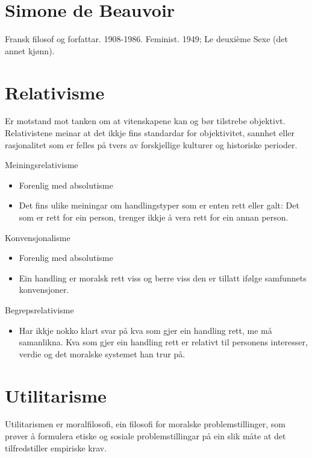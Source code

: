 \documentclass[a4paper]{IEEEtran}
\begin{document}
\section{Simone de Beauvoir}
\label{beauvoir}

Fransk filosof og forfattar. 1908-1986. Feminist. 1949; Le deuxième Sexe (det annet kjønn). 
\clearpage
\section{Relativisme}
\label{relativisme}
Er motstand mot tanken om at vitenskapene kan og bør tilstrebe objektivt. Relativistene meinar at det ikkje fins standardar for objektivitet, sannhet eller rasjonalitet som er felles på tvers av forskjellige kulturer og historiske perioder.
\bigskip

Meiningsrelativisme\bigskip
\begin{itemize}
    \item Forenlig med absolutisme
    \item Det fins ulike meiningar om handlingstyper som er enten rett eller galt: Det som er rett for ein person, trenger ikkje å vera rett for ein annan person.
\end{itemize}\bigskip

Konvensjonalisme\bigskip
\begin{itemize}
    \item Forenlig med absolutisme
    \item Ein handling er moralsk rett viss og berre viss den er tillatt ifølge samfunnets konvensjoner.
\end{itemize}\bigskip

Begrepsrelativisme\bigskip
\begin{itemize}
    \item Har ikkje nokko klart svar på kva som gjer ein handling rett, me må samanlikna. Kva som gjer ein handling rett er relativt til personens interesser, verdie og det moralske systemet han trur på.
\end{itemize}

\bigskip
\section{Utilitarisme}
\label{utilitarisme}

Utilitarismen er moralfilosofi, ein filosofi for moralske problemstillinger, som prøver å formulera etiske og sosiale problemstillingar på ein slik måte at det tilfredstiller empiriske krav.
\bigskip
\end{document}
